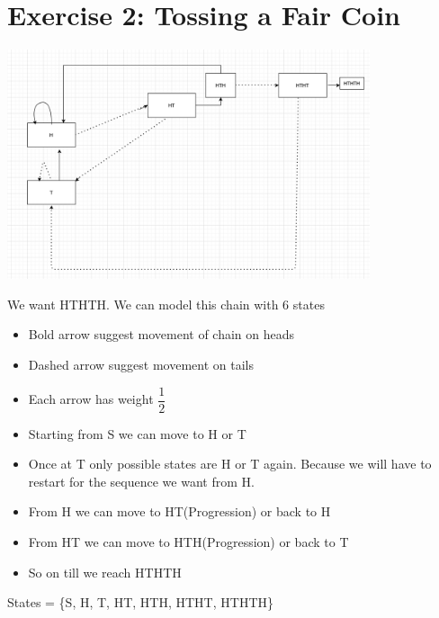 \documentclass[unicode,11pt,a4paper,oneside,numbers=endperiod,openany]{scrartcl}
\begin{document}

\section*{Exercise 2: Tossing a Fair Coin}

\begin{flushleft}
    \includegraphics[width=0.80\textwidth]{markov2.png}
\end{flushleft}

{We want HTHTH. We can model this chain with 6 states}\\
\begin{itemize}
    \item Bold arrow suggest movement of chain on heads
    \item Dashed arrow suggest movement on tails
    \item Each arrow has weight $\dfrac{1}{2}$
    \item Starting from S we can move to H or T
    \item Once at T only possible states are H or T again. Because we will have to restart for the sequence we want from H.
    \item From H we can move to HT(Progression) or back to H
    \item From HT we can move to HTH(Progression) or back to T
    \item So on till we reach HTHTH
\end{itemize}

{States = \{S, H, T, HT, HTH, HTHT, HTHTH\}}
\end{document}
